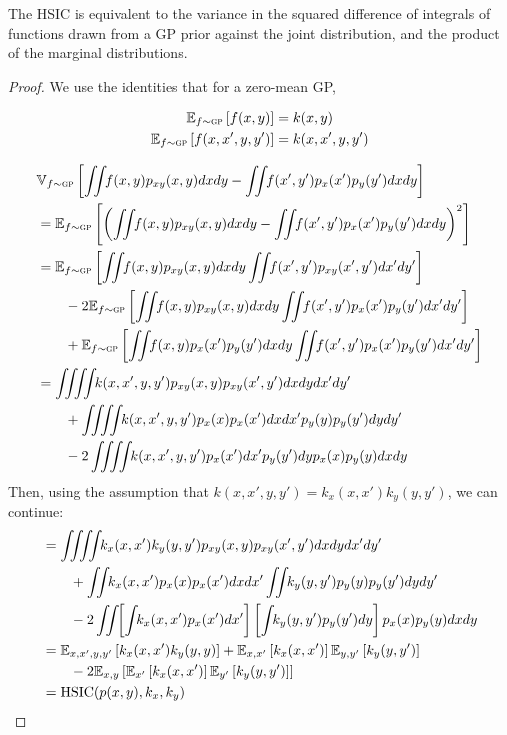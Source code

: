 \documentclass{article} %
\begin{document}
\begin{prop} The HSIC is equivalent to the variance in the squared difference of integrals of functions drawn from a GP prior against the joint distribution, and the product of the marginal distributions.
\end{prop}
%
\begin{proof}


We use the identities that for a zero-mean GP,

\begin{align}
\mathbb{E}_{f\sim {\textsc{gp}}} \left[ { f(x,y)} \right] & = k(x,y) \\
\mathbb{E}_{f\sim {\textsc{gp}}} \left[ { f(x,x',y,y')} \right] & = k(x,x',y,y')
\end{align}

\begin{align}
& \varianceargs{f\sim \gp}{ \int \!\!\! \int\!\! f(x,y)p_{xy}(x,y)dxdy - \int \!\!\! \int\!\! f(x',y')p_x(x')p_y(y')dx dy}\\
& = \expectargs{f\sim \gp}{ \left( \int \!\!\! \int\!\! f(x,y)p_{xy}(x,y)dxdy - \int \!\!\! \int\!\! f(x',y')p_x(x')p_y(y')dx dy \right)^2}\\
%
& = \expectargs{f\sim \gp}{ \int \!\!\! \int\!\! f(x,y)p_{xy}(x,y)dxdy \int \!\!\! \int\!\! f(x',y')p_{xy}(x',y')dx'dy'}\\
\nonumber & \qquad -2 \expectargs{f\sim \gp}{ \int \!\!\! \int\!\! f(x,y)p_{xy}(x,y)dxdy \int \!\!\! \int\!\! f(x',y')p_{x}(x')p_{y}(y')dx'dy'}\\
\nonumber & \qquad + \expectargs{f\sim \gp}{ \int \!\!\! \int\!\! f(x,y)p_{x}(x')p_{y}(y')dxdy \int \!\!\! \int\!\! f(x',y')p_{x}(x')p_{y}(y')dx'dy'}\\
%
& = \int \!\!\! \int \!\!\!\int \!\!\! \int\!\! k(x,x',y,y')p_{xy}(x,y)p_{xy}(x',y')dxdydx'dy' \\
\nonumber & \qquad + \int \!\!\! \int\!\!\! \int \!\!\! \int\!\! k(x,x',y,y') p_{x}(x)p_{x}(x')dxdx' p_y(y) p_y(y') dydy' \\
\nonumber & \qquad - 2 \int \!\!\! \int \!\!\!\int \!\!\! \int\!\! k(x,x',y,y') p_x(x') dx' p_y(y')dy p_x(x) p_y(y) dx dy \\
\end{align}
%
Then, using the assumption that $k(x,x',y,y') = k_x(x,x') k_y(y,y')$, we can continue:
%
\begin{align}
& = \int \!\!\! \int \!\!\!\int \!\!\! \int\!\! k_x(x,x')k_y(y,y')p_{xy}(x,y)p_{xy}(x',y')dxdydx'dy' \\
\nonumber & \qquad + \int \!\!\! \int\!\! k_x(x,x')p_{x}(x)p_{x}(x')dxdx'\int \!\!\! \int\!\! k_y(y,y') p_y(y) p_y(y') dydy' \\
\nonumber & \qquad - 2 \int \!\!\! \int\!\! \left[\int\!\! k_x(x,x') p_x(x') dx' \right]\left[\int\!\!k_y(y,y') p_y(y')dy\right] p_x(x) p_y(y) dx dy \\
%
& = \expectargs{x, x', y, y'}{k_x(x,x')k_y(y,y)} + \expectargs{x, x'}{k_x(x,x')}\expectargs{y, y'}{k_y(y,y')} \\
\nonumber  & \qquad - 2 \expectargs{x, y}{\expectargs{x'}{k_x(x,x')}\expectargs{y'}{k_y(y,y')}} \\
& = \hsic(p(x,y),k_x, k_y)	
\end{align}
\end{proof}
\end{document}
